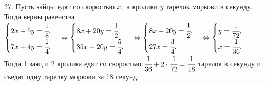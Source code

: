 27. Пусть зайцы едят со скоростью $x,$ а кролики $y$ тарелок моркови в секунду. Тогда верны равенства\\
$\begin{cases}2x+5y=\cfrac{1}{8},\\ 7x+4y=\cfrac{1}{4}.\end{cases}\Leftrightarrow
\begin{cases}8x+20y=\cfrac{1}{2},\\ 35x+20y=\cfrac{5}{4}.\end{cases}\Leftrightarrow
\begin{cases}8x+20y=\cfrac{1}{2},\\ 27x=\cfrac{3}{4}.\end{cases}\Leftrightarrow
\begin{cases} y=\cfrac{1}{72},\\ x=\cfrac{1}{36}.\end{cases}$
Тогда 1 заяц и 2 кролика едят со скоростью $\cfrac{1}{36}+2\cdot\cfrac{1}{72}=\cfrac{1}{18}$ тарелок в секунду и съедят одну тарелку моркови за 18 секунд.\\
